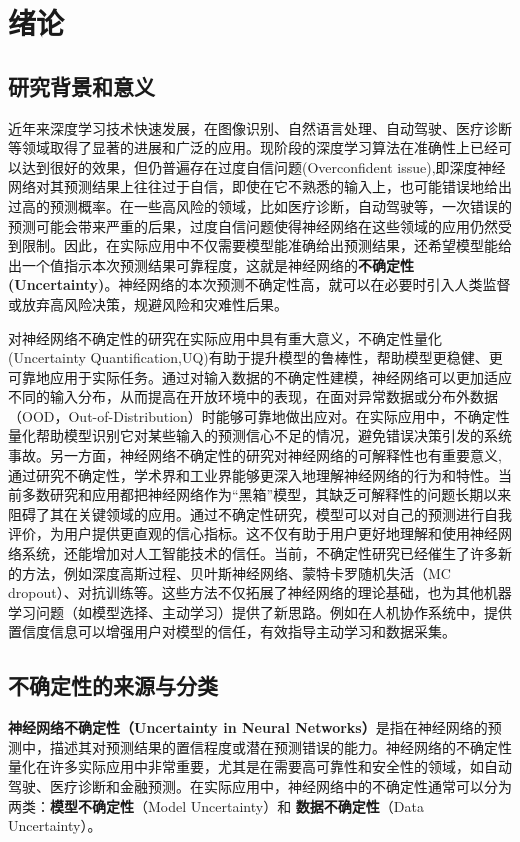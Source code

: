 \chapter{绪论}
\section{研究背景和意义}
近年来深度学习技术快速发展，在图像识别\cite{krizhevsky2012imagenet}、自然语言处理\cite{brown2020language}、自动驾驶\cite{teichmann2018multinet}、医疗诊断\cite{gulshan2016development}等领域取得了显著的进展和广泛的应用。现阶段的深度学习算法在准确性上已经可以达到很好的效果，但仍普遍存在过度自信问题(Overconfident issue),即深度神经网络对其预测结果上往往过于自信，即使在它不熟悉的输入上，也可能错误地给出过高的预测概率。在一些高风险的领域，比如医疗诊断，自动驾驶等，一次错误的预测可能会带来严重的后果，过度自信问题使得神经网络在这些领域的应用仍然受到限制。因此，在实际应用中不仅需要模型能准确给出预测结果，还希望模型能给出一个值指示本次预测结果可靠程度，这就是神经网络的\textbf{不确定性(Uncertainty)}。神经网络的本次预测不确定性高，就可以在必要时引入人类监督或放弃高风险决策，规避风险和灾难性后果。

对神经网络不确定性的研究在实际应用中具有重大意义，不确定性量化(Uncertainty Quantification,UQ)有助于提升模型的鲁棒性，帮助模型更稳健、更可靠地应用于实际任务。通过对输入数据的不确定性建模，神经网络可以更加适应不同的输入分布，从而提高在开放环境中的表现，在面对异常数据或分布外数据（OOD，Out-of-Distribution）时能够可靠地做出应对。在实际应用中，不确定性量化帮助模型识别它对某些输入的预测信心不足的情况，避免错误决策引发的系统事故。另一方面，神经网络不确定性的研究对神经网络的可解释性也有重要意义,通过研究不确定性，学术界和工业界能够更深入地理解神经网络的行为和特性。当前多数研究和应用都把神经网络作为“黑箱”模型，其缺乏可解释性的问题长期以来阻碍了其在关键领域的应用。通过不确定性研究，模型可以对自己的预测进行自我评价，为用户提供更直观的信心指标。这不仅有助于用户更好地理解和使用神经网络系统，还能增加对人工智能技术的信任。当前，不确定性研究已经催生了许多新的方法，例如深度高斯过程、贝叶斯神经网络、蒙特卡罗随机失活（MC dropout）、对抗训练等。这些方法不仅拓展了神经网络的理论基础，也为其他机器学习问题（如模型选择、主动学习）提供了新思路。例如在人机协作系统中，提供置信度信息可以增强用户对模型的信任，有效指导主动学习和数据采集。

\section{不确定性的来源与分类}
\textbf{神经网络不确定性（Uncertainty in Neural Networks）}是指在神经网络的预测中，描述其对预测结果的置信程度或潜在预测错误的能力\cite{abdar2021review}。神经网络的不确定性量化在许多实际应用中非常重要，尤其是在需要高可靠性和安全性的领域，如自动驾驶、医疗诊断和金融预测\cite{gawlikowski2023survey}\cite{he2023survey}\cite{gal2016uncertainty}。在实际应用中，神经网络中的不确定性通常可以分为两类\cite{abdar2021review}：\textbf{模型不确定性}（Model Uncertainty）和\textbf{ 数据不确定性}（Data Uncertainty）。


